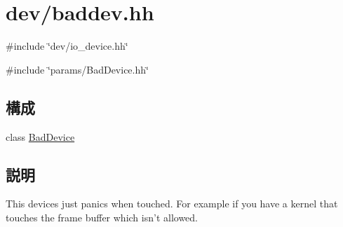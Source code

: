 \hypertarget{baddev_8hh}{
\section{dev/baddev.hh}
\label{baddev_8hh}
}
{\ttfamily \#include \char`\"{}dev/io\_\-device.hh\char`\"{}}\par
{\ttfamily \#include \char`\"{}params/BadDevice.hh\char`\"{}}\par
\subsection*{構成}
\begin{DoxyCompactItemize}
\item 
class \hyperlink{classBadDevice}{BadDevice}
\end{DoxyCompactItemize}


\subsection{説明}
This devices just panics when touched. For example if you have a kernel that touches the frame buffer which isn't allowed. 